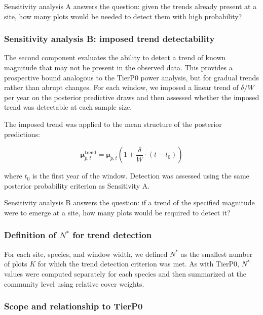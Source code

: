\documentclass[
  11pt,
]{article}
\begin{document}
Sensitivity analysis A answers the question: given the trends already
present at a site, how many plots would be needed to detect them with
high probability?

\subsubsection{Sensitivity analysis B: imposed trend
detectability}\label{sensitivity-analysis-b-imposed-trend-detectability}

The second component evaluates the ability to detect a trend of known
magnitude that may not be present in the observed data. This provides a
prospective bound analogous to the TierP0 power analysis, but for
gradual trends rather than abrupt changes. For each window, we imposed a
linear trend of \(\delta / W\) per year on the posterior predictive
draws and then assessed whether the imposed trend was detectable at each
sample size.

The imposed trend was applied to the mean structure of the posterior
predictions:

\[
\boldsymbol{\mu}^{\text{trend}}_{p,t} = \boldsymbol{\mu}_{p,t} \left(1 + \frac{\delta}{W} \cdot (t - t_0)\right)
\]

where \(t_0\) is the first year of the window. Detection was assessed
using the same posterior probability criterion as Sensitivity A.

Sensitivity analysis B answers the question: if a trend of the specified
magnitude were to emerge at a site, how many plots would be required to
detect it?

\subsubsection{\texorpdfstring{Definition of \(N^*\) for trend
detection}{Definition of N\^{}* for trend detection}}\label{definition-of-n-for-trend-detection}

For each site, species, and window width, we defined \(N^*\) as the
smallest number of plots \(K\) for which the trend detection criterion
was met. As with TierP0, \(N^*\) values were computed separately for
each species and then summarized at the community level using relative
cover weights.

\subsubsection{Scope and relationship to
TierP0}\label{scope-and-relationship-to-tierp0}
\end{document}
